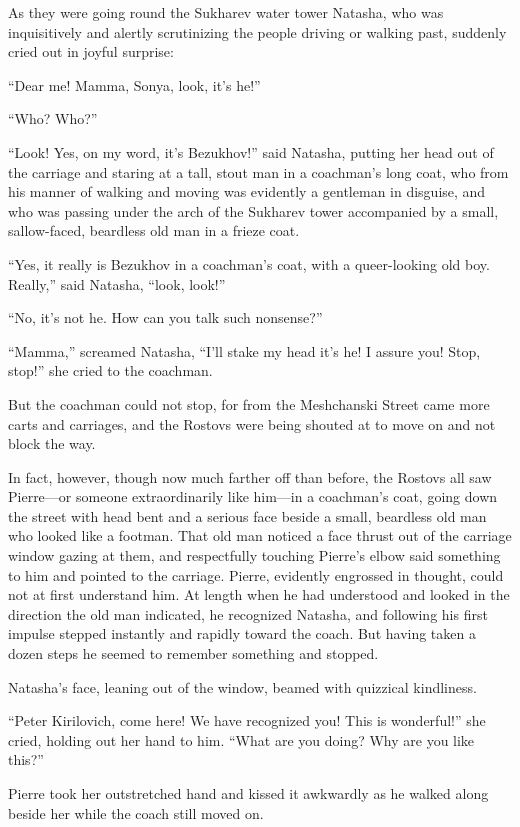 As they were going round the Sukharev water tower Natasha, who
was inquisitively and alertly scrutinizing the people driving or
walking past, suddenly cried out in joyful surprise:

``Dear me! Mamma, Sonya, look, it's he!''

``Who? Who?''

``Look! Yes, on my word, it's Bezukhov!'' said Natasha, putting
her head out of the carriage and staring at a tall, stout man in
a coachman's long coat, who from his manner of walking and moving
was evidently a gentleman in disguise, and who was passing under
the arch of the Sukharev tower accompanied by a small,
sallow-faced, beardless old man in a frieze coat.

``Yes, it really is Bezukhov in a coachman's coat, with a
queer-looking old boy. Really,'' said Natasha, ``look, look!''

``No, it's not he. How can you talk such nonsense?''

``Mamma,'' screamed Natasha, ``I'll stake my head it's he! I
assure you!  Stop, stop!'' she cried to the coachman.

But the coachman could not stop, for from the Meshchanski Street
came more carts and carriages, and the Rostovs were being shouted
at to move on and not block the way.

In fact, however, though now much farther off than before, the
Rostovs all saw Pierre---or someone extraordinarily like him---in
a coachman's coat, going down the street with head bent and a
serious face beside a small, beardless old man who looked like a
footman. That old man noticed a face thrust out of the carriage
window gazing at them, and respectfully touching Pierre's elbow
said something to him and pointed to the carriage. Pierre,
evidently engrossed in thought, could not at first understand
him. At length when he had understood and looked in the direction
the old man indicated, he recognized Natasha, and following his
first impulse stepped instantly and rapidly toward the coach. But
having taken a dozen steps he seemed to remember something and
stopped.

Natasha's face, leaning out of the window, beamed with quizzical
kindliness.

``Peter Kirilovich, come here! We have recognized you! This is
wonderful!'' she cried, holding out her hand to him. ``What are
you doing?  Why are you like this?''

Pierre took her outstretched hand and kissed it awkwardly as he
walked along beside her while the coach still moved on.

